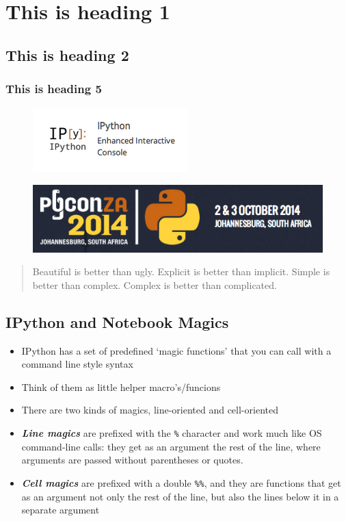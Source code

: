 \documentclass{article}
\begin{document}
\section{This is heading 1}

\subsection{This is heading 2}

\subsubsection{This is heading 5}

\begin{figure}[htbp]
\centering
\includegraphics{static/img/ipy.png}
\end{figure}

\begin{figure}[htbp]
\centering
\includegraphics{static/img/pyconza.png}
\end{figure}

\begin{quote}
Beautiful is better than ugly. Explicit is better than implicit. Simple
is better than complex. Complex is better than complicated.
\end{quote}

    \subsection{IPython and Notebook Magics}

\begin{itemize}
\itemsep1pt\parskip0pt
\item
  IPython has a set of predefined `magic functions' that you can call
  with a command line style syntax
\item
  Think of them as little helper macro's/funcions
\item
  There are two kinds of magics, line-oriented and cell-oriented
\item
  \textbf{\emph{Line magics}} are prefixed with the \texttt{\%}
  character and work much like OS command-line calls: they get as an
  argument the rest of the line, where arguments are passed without
  parentheses or quotes.
\item
  \textbf{\emph{Cell magics}} are prefixed with a double \texttt{\%\%},
  and they are functions that get as an argument not only the rest of
  the line, but also the lines below it in a separate argument
\end{itemize}
\end{document}
